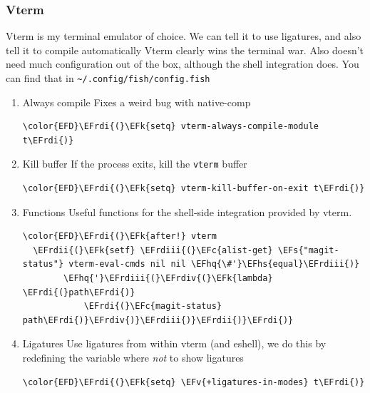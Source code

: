 \documentclass{scrartcl}
\newcommand{\EFk}[1]{\textcolor{EFk}{#1}} %
\newcommand{\EFs}[1]{\textcolor{EFs}{#1}} %
\newcommand{\EFc}[1]{\textcolor{EFc}{#1}} %
\newcommand{\EFv}[1]{\textcolor{EFv}{#1}} %
\newcommand{\EFhq}[1]{\textcolor{EFhq}{#1}} %
\newcommand{\EFhs}[1]{\textcolor{EFhs}{#1}} %
\newcommand{\EFrdi}[1]{\textcolor{EFrdi}{#1}} %
\newcommand{\EFrdii}[1]{\textcolor{EFrdii}{#1}} %
\newcommand{\EFrdiii}[1]{\textcolor{EFrdiii}{#1}} %
\newcommand{\EFrdiv}[1]{\textcolor{EFrdiv}{#1}} %
\begin{document}
\subsubsection{Vterm}
\label{sec:org30faf95}
Vterm is my terminal emulator of choice. We can tell it to use ligatures, and also tell it to compile automatically
Vterm clearly wins the terminal war. Also doesn't need much configuration out of
the box, although the shell integration does. You can find that in \texttt{\textasciitilde{}/.config/fish/config.fish}
\begin{enumerate}
\item Always compile
\label{sec:org3bebe54}
Fixes a weird bug with native-comp
\begin{Code}
\begin{Verbatim}[]
\color{EFD}\EFrdi{(}\EFk{setq} vterm-always-compile-module t\EFrdi{)}
\end{Verbatim}
\end{Code}

\item Kill buffer
\label{sec:orga4e7d0f}
If the process exits, kill the \texttt{vterm} buffer
\begin{Code}
\begin{Verbatim}[]
\color{EFD}\EFrdi{(}\EFk{setq} vterm-kill-buffer-on-exit t\EFrdi{)}
\end{Verbatim}
\end{Code}

\item Functions
\label{sec:org42c293e}
Useful functions for the shell-side integration provided by vterm.
\begin{Code}
\begin{Verbatim}[]
\color{EFD}\EFrdi{(}\EFk{after!} vterm
  \EFrdii{(}\EFk{setf} \EFrdiii{(}\EFc{alist-get} \EFs{"magit-status"} vterm-eval-cmds nil nil \EFhq{\#'}\EFhs{equal}\EFrdiii{)}
        \EFhq{'}\EFrdiii{(}\EFrdiv{(}\EFk{lambda} \EFrdi{(}path\EFrdi{)}
            \EFrdi{(}\EFc{magit-status} path\EFrdi{)}\EFrdiv{)}\EFrdiii{)}\EFrdii{)}\EFrdi{)}
\end{Verbatim}
\end{Code}

\item Ligatures
\label{sec:orgf1f281b}
Use ligatures from within vterm (and eshell), we do this by redefining the variable where \emph{not} to show ligatures
\begin{Code}
\begin{Verbatim}[]
\color{EFD}\EFrdi{(}\EFk{setq} \EFv{+ligatures-in-modes} t\EFrdi{)}
\end{Verbatim}
\end{Code}
\end{enumerate}
\end{document}
